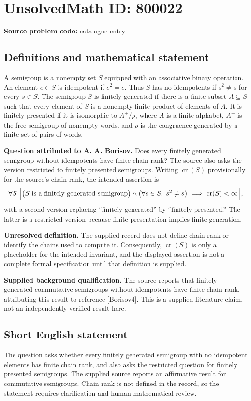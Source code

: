 \documentclass[11pt]{article}
\begin{document}
\section*{UnsolvedMath ID: 800022}
\textbf{Source problem code:} catalogue entry
\subsection{Definitions and mathematical statement}
A semigroup is a nonempty set \(S\) equipped with an associative binary operation. An element \(e\in S\) is idempotent if \(e^2=e\). Thus \(S\) has no idempotents if \(s^2\ne s\) for every \(s\in S\). The semigroup \(S\) is finitely generated if there is a finite subset \(A\subseteq S\) such that every element of \(S\) is a nonempty finite product of elements of \(A\). It is finitely presented if it is isomorphic to \(A^+/\rho\), where \(A\) is a finite alphabet, \(A^+\) is the free semigroup of nonempty words, and \(\rho\) is the congruence generated by a finite set of pairs of words.

\textbf{Question attributed to A. A. Borisov.} Does every finitely generated semigroup without idempotents have finite chain rank? The source also asks the version restricted to finitely presented semigroups. Writing \(\operatorname{cr}(S)\) provisionally for the source's chain rank, the intended assertion is
\[
\forall S\;\Bigl[\bigl(S\text{ is a finitely generated semigroup}\bigr)\land\bigl(\forall s\in S,\ s^2\ne s\bigr)\ \Longrightarrow\ \operatorname{cr}(S)<\infty\Bigr],
\]
with a second version replacing ``finitely generated'' by ``finitely presented.'' The latter is a restricted version because finite presentation implies finite generation.

\textbf{Unresolved definition.} The supplied record does not define chain rank or identify the chains used to compute it. Consequently, \(\operatorname{cr}(S)\) is only a placeholder for the intended invariant, and the displayed assertion is not a complete formal specification until that definition is supplied.

\textbf{Supplied background qualification.} The source reports that finitely generated commutative semigroups without idempotents have finite chain rank, attributing this result to reference [Borisov4]. This is a supplied literature claim, not an independently verified result here.
\subsection{Short English statement}
The question asks whether every finitely generated semigroup with no idempotent elements has finite chain rank, and also asks the restricted question for finitely presented semigroups. The supplied source reports an affirmative result for commutative semigroups. Chain rank is not defined in the record, so the statement requires clarification and human mathematical review.
\end{document}
